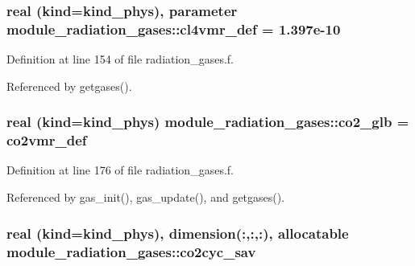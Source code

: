 \subsubsection[{\texorpdfstring{cl4vmr\+\_\+def}{cl4vmr_def}}]{\setlength{\rightskip}{0pt plus 5cm}real (kind=kind\+\_\+phys), parameter module\+\_\+radiation\+\_\+gases\+::cl4vmr\+\_\+def = 1.\+397e-\/10\hspace{0.3cm}{\ttfamily [private]}}\hypertarget{namespacemodule__radiation__gases_a013f8faaee6df0c7c032e1786770c110}{}\label{namespacemodule__radiation__gases_a013f8faaee6df0c7c032e1786770c110}


Definition at line 154 of file radiation\+\_\+gases.\+f.



Referenced by getgases().

\subsubsection[{\texorpdfstring{co2\+\_\+glb}{co2_glb}}]{\setlength{\rightskip}{0pt plus 5cm}real (kind=kind\+\_\+phys) module\+\_\+radiation\+\_\+gases\+::co2\+\_\+glb = {\bf co2vmr\+\_\+def}\hspace{0.3cm}{\ttfamily [private]}}\hypertarget{namespacemodule__radiation__gases_a0398d6837c9e8c41359e76a754147002}{}\label{namespacemodule__radiation__gases_a0398d6837c9e8c41359e76a754147002}


Definition at line 176 of file radiation\+\_\+gases.\+f.



Referenced by gas\+\_\+init(), gas\+\_\+update(), and getgases().

\subsubsection[{\texorpdfstring{co2cyc\+\_\+sav}{co2cyc_sav}}]{\setlength{\rightskip}{0pt plus 5cm}real (kind=kind\+\_\+phys), dimension(\+:,\+:,\+:), allocatable module\+\_\+radiation\+\_\+gases\+::co2cyc\+\_\+sav\hspace{0.3cm}{\ttfamily [private]}}\hypertarget{namespacemodule__radiation__gases_a3985e306e5555089909fd42a4cc93afb}{}\label{namespacemodule__radiation__gases_a3985e306e5555089909fd42a4cc93afb}


